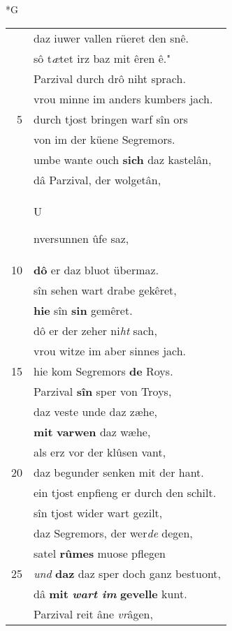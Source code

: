 \documentclass[8pt,a4paper,notitlepage]{article}
\begin{document}
\newpage
\begin{table}[ht]
\begin{minipage}[t]{0.5\linewidth}
\small
\begin{center}*G
\end{center}
\begin{tabular}{rl}
 & daz iuwer vallen rüeret den snê.\\ 
 & sô t\textit{æ}tet irz baz mit êren ê."\\ 
 & Parzival durch drô niht sprach.\\ 
 & vrou minne im anders kumbers jach.\\ 
5 & durch tjost bringen warf sîn ors\\ 
 & von im der küene Segremors.\\ 
 & umbe wante ouch \textbf{sich} daz kastelân,\\ 
 & dâ Parzival, der wolgetân,\\ 
 & \begin{large}U\end{large}nversunnen ûfe saz,\\ 
10 & \textbf{dô} er daz bluot übermaz.\\ 
 & sîn sehen wart drabe gekêret,\\ 
 & \textbf{hie} sîn \textbf{sin} gemêret.\\ 
 & dô er der zeher ni\textit{ht} sach,\\ 
 & vrou witze im aber sinnes jach.\\ 
15 & hie kom Segremors \textbf{de} Roys.\\ 
 & Parzival \textbf{sîn} sper von Troys,\\ 
 & daz veste unde daz zæhe,\\ 
 & \textbf{mit} \textbf{varwen} daz wæhe,\\ 
 & als erz vor der klûsen vant,\\ 
20 & daz begunder senken mit der hant.\\ 
 & ein tjost enpfieng er durch den schilt.\\ 
 & sîn tjost wider wart gezilt,\\ 
 & daz Segremors, der wer\textit{de} degen,\\ 
 & satel \textbf{rûmes} muose pflegen\\ 
25 & \textit{und} \textbf{daz} daz sper doch ganz bestuont,\\ 
 & dâ \textbf{mit} \textit{\textbf{wart im}} \textbf{gevelle} kunt.\\ 
 & Parzival reit âne \textit{vr}âgen,\\ 

\end{tabular}
\end{minipage}
\end{table}
\end{document}
